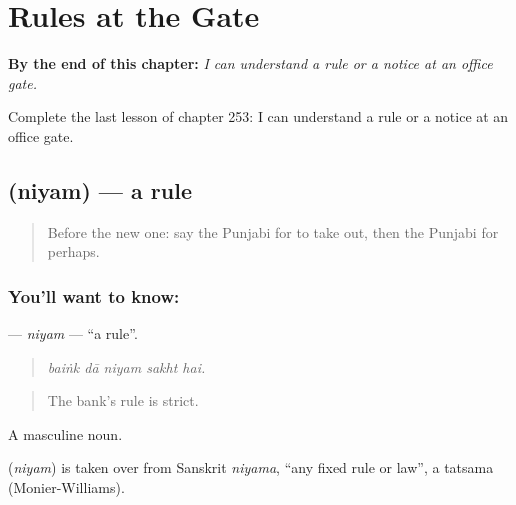 
\chapter{Rules at the Gate}
\label{ch:pa-a2-rules-at-the-gate}

\begin{chapteropening}
\textbf{By the end of this chapter:} \emph{I can understand a rule or a notice at an office gate.}

Complete the last lesson of chapter 253: I can understand a rule or a notice at an office gate.
\end{chapteropening}

\section[\texorpdfstring{\pa{ਨਿਯਮ} (niyam)}{ਨਿਯਮ (niyam)}]{ (niyam) — a rule}

\label{lesson:PA-C253-niyam}



\begin{quote}
Before the new one: say the Punjabi for to take out, then the Punjabi for perhaps.
\end{quote}

\subsection*{You'll want to know: }
\textbf{} — \emph{niyam} — \textquotedblleft{}a rule\textquotedblright{}.

\begin{quote}
    
\end{quote}

\begin{quote}
\emph{baiṅk dā niyam sakht hai.}
\end{quote}

\begin{quote}
The bank's rule is strict.
\end{quote}

A masculine noun.

\begin{cousinweb}
\textbf{} (\emph{niyam}) is taken over from Sanskrit \emph{niyama}, \textquotedblleft{}any fixed rule or law\textquotedblright{}, a tatsama (Monier-Williams).
\end{cousinweb}

